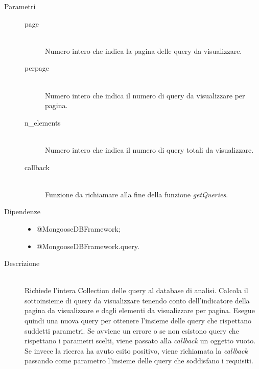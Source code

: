 \begin{description}
\begin{mldescription}
    \begin{description}
	 \item[Parametri] \hfill
	  \begin{description}
	   \item[page] \hfill \\
	   Numero intero che indica la pagina delle query da visualizzare.
	   \item[perpage] \hfill \\
	   Numero intero che indica il numero di query da visualizzare per pagina.
	   \item[n\_elements] \hfill \\
	   Numero intero che indica il numero di query totali da visualizzare.
	   \item[callback] \hfill \\
	   Funzione da richiamare alla fine della funzione \textit{getQueries}.
	  \end{description}
	 \item[Dipendenze] \hfill
	  \begin{itemize}
	   \item @MongooseDBFramework;	   
	   \item @MongooseDBFramework.query.
	  \end{itemize}
	 \item[Descrizione] \hfill \\
	 Richiede l'intera Collection delle query al database di analisi. Calcola il sottoinsieme di query da visualizzare tenendo conto dell'indicatore della pagina da visualizzare e dagli elementi da visualizzare per pagina. Esegue quindi una nuova query per ottenere l'insieme delle query che rispettano suddetti parametri. Se avviene un errore o se non esistono query che rispettano i parametri scelti, viene passato alla \textit{callback} un oggetto vuoto. Se invece la ricerca ha avuto esito positivo, viene richiamata la \textit{callback} passando come parametro l'insieme delle query che soddisfano i requisiti. 
	\end{description}	    
    

\end{mldescription}
\end{description}
